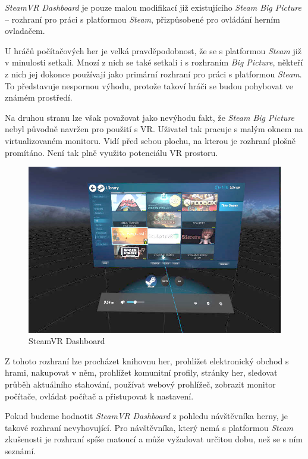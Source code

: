 \emph{SteamVR Dashboard} je pouze malou modifikací již existujícího
\emph{Steam Big Picture} -- rozhraní pro práci s platformou
\emph{Steam}, přizpůsobené pro ovládání herním ovladačem.

U hráčů počítačových her je velká pravděpodobnost, že se s platformou
\emph{Steam} již v minulosti setkali. Mnozí z nich se také setkali i s
rozhraním \emph{Big Picture}, někteří z nich jej dokonce používají jako
primární rozhraní pro práci s platformou \emph{Steam}. To představuje nespornou výhodu, protože takoví hráči se budou pohybovat ve
známém prostředí.

Na druhou stranu lze však považovat jako nevýhodu fakt, že \emph{Steam
Big Picture} nebyl původně navržen pro použití s VR. Uživatel tak pracuje s
malým oknem na virtualizovaném monitoru. Vidí před sebou plochu, na
kterou je rozhraní plošně promítáno. Není tak plně využito potenciálu VR
prostoru.

\begin{figure}[h!]
\centering
\includegraphics[width=12cm]{src/assets/steamvr-library.jpg}
\caption{SteamVR Dashboard \autocite{tomshardw}}
\end{figure}

Z tohoto rozhraní lze procházet knihovnu her, prohlížet elektronický
obchod s hrami, nakupovat v něm, prohlížet komunitní profily, stránky
her, sledovat průběh aktuálního stahování, používat webový prohlížeč,
zobrazit monitor počítače, ovládat počítač a přistupovat k nastavení.

Pokud budeme hodnotit \emph{SteamVR Dashboard} z pohledu návštěvníka
herny, je takové rozhraní nevyhovující. Pro návštěvníka, který nemá s
platformou \emph{Steam} zkušenosti je rozhraní spíše matoucí a může
vyžadovat určitou dobu, než se s ním seznámí. 

